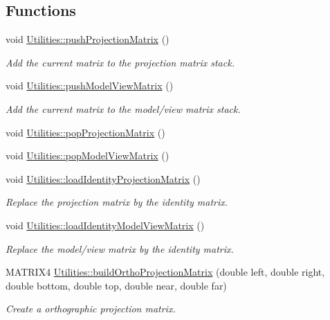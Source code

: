 \subsection*{Functions}
\begin{DoxyCompactItemize}
\item 
void \hyperlink{namespace_utilities_a4ff1a91f49f45940ef3fe39374d6fad3}{Utilities::pushProjectionMatrix} ()
\begin{DoxyCompactList}\small\item\em Add the current matrix to the projection matrix stack. \end{DoxyCompactList}\item 
void \hyperlink{namespace_utilities_a759523b332a302b032d7e1dbe3d70589}{Utilities::pushModelViewMatrix} ()
\begin{DoxyCompactList}\small\item\em Add the current matrix to the model/view matrix stack. \end{DoxyCompactList}\item 
void \hyperlink{namespace_utilities_a34e5aecb15bd70f3d358b1df30ad2b1e}{Utilities::popProjectionMatrix} ()
\item 
void \hyperlink{namespace_utilities_afa855d36de0ce9d6d52e2157da5063b9}{Utilities::popModelViewMatrix} ()
\item 
void \hyperlink{namespace_utilities_af4402f472bd1945b6792f547cd498f95}{Utilities::loadIdentityProjectionMatrix} ()
\begin{DoxyCompactList}\small\item\em Replace the projection matrix by the identity matrix. \end{DoxyCompactList}\item 
void \hyperlink{namespace_utilities_a80dad624c31abf68e2e44997020210a5}{Utilities::loadIdentityModelViewMatrix} ()
\begin{DoxyCompactList}\small\item\em Replace the model/view matrix by the identity matrix. \end{DoxyCompactList}\item 
MATRIX4 \hyperlink{namespace_utilities_a7ffbee866eb154b2a032141c04d43021}{Utilities::buildOrthoProjectionMatrix} (double left, double right, double bottom, double top, double near, double far)
\begin{DoxyCompactList}\small\item\em Create a orthographic projection matrix. \end{DoxyCompactList}\item 

\end{DoxyCompactItemize}
